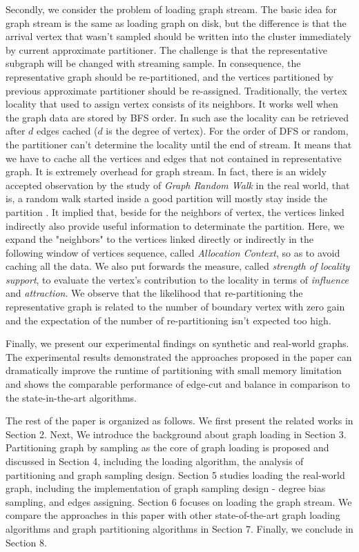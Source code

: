 \documentclass{sig-alternate-2013}
\begin{document}
Secondly, we consider the problem of loading graph stream. The basic idea for graph stream is the same as loading graph on disk, but the difference is that the arrival vertex that wasn't sampled should be written into the cluster immediately by current approximate partitioner. The challenge is that the representative subgraph will be changed with streaming sample. In consequence, the representative graph should be re-partitioned, and the vertices partitioned by previous approximate partitioner should be re-assigned.
Traditionally, the vertex locality that used to assign vertex consists of its neighbors. It works well when the graph data are stored by BFS order. In such ase the locality can be retrieved after $d$ edges cached ($d$ is the degree of vertex). For the order of DFS or random, the partitioner can't determine the locality until the end of stream. It means that we have to cache all the vertices and edges that not contained in representative graph. It is extremely overhead for graph stream. In fact, there is an widely accepted observation by the study of \textit{Graph Random Walk} in the real world, that is, a random walk started inside a good partition will mostly stay inside the partition \cite{DBLP:books/sp/social11}. It implied that, beside for the neighbors of vertex, the vertices linked indirectly also provide useful information to determinate the partition. Here, we expand the "neighbors" to the vertices linked directly or indirectly in the following window of vertices sequence, called \emph{Allocation Context}, so as to avoid caching all the data. We also put forwards the measure, called \textit{strength of locality support}, to evaluate the vertex's contribution to the locality in terms of \textit{influence} and \textit{attraction}. We observe that the likelihood that re-partitioning the representative graph is related to the number of boundary vertex with zero gain and the expectation of the number of re-partitioning isn't expected too high.

Finally, we present our experimental findings on synthetic and real-world graphs. The experimental results
demonstrated the approaches proposed in the paper can dramatically improve the runtime of partitioning with small memory limitation and shows the comparable performance of edge-cut and balance in comparison to the state-in-the-art algorithms.

The rest of the paper is organized as follows. We first present the related works in Section 2. Next, We introduce the background about graph loading in Section 3. Partitioning graph by sampling as the core of graph loading is proposed and discussed in Section 4, including the loading algorithm, the analysis of partitioning and graph sampling design. Section 5 studies loading the real-world graph, including the implementation of graph sampling design - degree bias sampling, and edges assigning. Section 6 focuses on loading the graph stream. We compare the approaches in this paper with other state-of-the-art graph loading algorithms and graph partitioning algorithms in Section 7. Finally, we conclude in Section 8.
\end{document}
